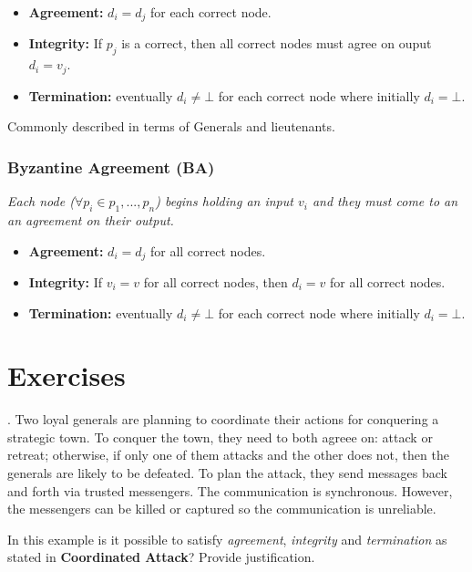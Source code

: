 \documentclass[12pt]{article}
\newcounter{question}
\newcommand{\question}[1]{
    \stepcounter{question}
    \thequestion. #1 \hfill
}
\begin{document}
\begin{itemize}
    \item \textbf{Agreement: } $d_i = d_j$ for each correct node.
    \item \textbf{Integrity: } If $p_{j}$ is a correct, then all correct nodes must agree on ouput $d_i = v_j$.
    \item \textbf{Termination: } eventually $d_i \not = \bot$ for each correct node where initially $d_i = \bot$.
\end{itemize}

Commonly described in terms of Generals and lieutenants.

\subsubsection*{Byzantine Agreement (BA)}

\begin{center}
    \textit{Each node ($\forall p_i \in {p_1, ..., p_n}$) begins holding an input $v_i$ and they must come to an an agreement on their output.}
\end{center}

\begin{itemize}
    \item \textbf{Agreement: } $d_i = d_j$ for all correct nodes.
    \item \textbf{Integrity: } If $v_i = v$ for all correct nodes, then $d_i = v$ for all correct nodes.
    \item \textbf{Termination: } eventually  $d_i \not = \bot$ for each correct node where initially $d_i = \bot$.
\end{itemize}

\pagebreak

\section*{Exercises}

\setcounter{question}{35}

\question{Two loyal generals are planning to coordinate their actions for conquering a strategic town. To conquer the town, they need to both agreee on: attack or retreat; otherwise, if only one of them attacks and the other does not, then the generals are likely to be defeated. To plan the attack, they send messages back and forth via trusted messengers. The communication is synchronous. However, the messengers can be killed or captured so the communication is unreliable.


In this example is it possible to satisfy \textit{agreement}, \textit{integrity} and \textit{termination} as stated in \textbf{Coordinated Attack}? Provide justification.}
\end{document}
